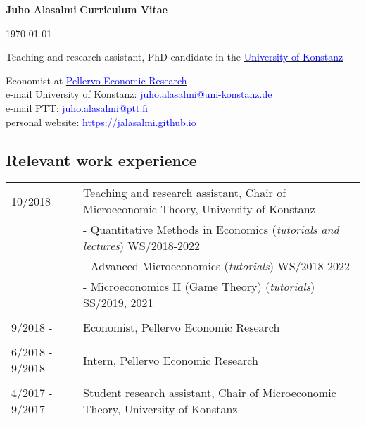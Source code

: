 \documentclass[16pt]{article}
\begin{document}
\noindent \textbf{Juho Alasalmi} \hfill{\textbf{Curriculum Vitae}} \par
\noindent  \hfill{\today} \par
\noindent Teaching and research assistant, PhD candidate in the \href{https://www.wiwi.uni-konstanz.de/goldluecke/team/academic-staff/doctoral-students/}{\textcolor{blue}{University of Konstanz}} \par
\noindent Economist at \href{http://www.ptt.fi/}{\textcolor{blue}{Pellervo Economic Research}} \\

\noindent e-mail University of Konstanz: \href{mailto: juho.alasalmi@uni-konstanz.de}{\textcolor{blue}{juho.alasalmi@uni-konstanz.de}} \\
\noindent e-mail PTT: \href{mailto: juho.alasalmi@ptt.fi}{\textcolor{blue}{juho.alasalmi@ptt.fi}}\\
\noindent personal website: \href{https://jalasalmi.github.io}{\textcolor{blue}{https://jalasalmi.github.io}}

\subsection*{Relevant work experience}
\begin{tabular}{@{}p{1.5in}p{5in}}
10/2018 -            & Teaching and research assistant, Chair of Microeconomic Theory,  University of Konstanz \\
                          &   -  Quantitative Methods in Economics (\textit{tutorials and lectures}) WS/2018-2022  \\
                          &   -  Advanced Microeconomics (\textit{tutorials}) WS/2018-2022 \\   
                          &   -  Microeconomics II (Game Theory) (\textit{tutorials}) SS/2019, 2021 \\   
                                                 
\\
9/2018 -            & Economist, Pellervo Economic Research\\

\\
6/2018 - 9/2018 & Intern, Pellervo Economic Research\\

\\
4/2017 - 9/2017 & Student research assistant, Chair of Microeconomic Theory,  University of Konstanz\\
                           
\end{tabular}
\end{document}
